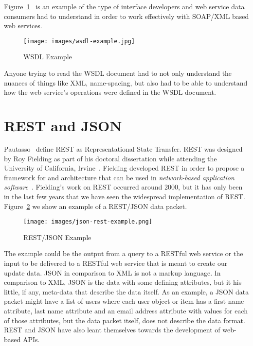 Figure~\ref{f:wsdl-example}~\cite{hid505mycodde2016} is an example of the type of
interface developers and web service data consumers had to understand in order
to work effectively with SOAP/XML based web services.  
\begin{figure}[!ht]
  \centering\texttt{[image: images/wsdl-example.jpg]}
  \caption{WSDL Example}\label{f:wsdl-example}
\end{figure}
Anyone trying to read the WSDL document had to not only understand the nuances 
of things like XML, name-spacing, but also had to be able to understand how the 
web service's operations were defined in the WSDL document.

\section{REST and JSON}
Pautasso~\cite{hid505Pautasso2008} define REST as Representational State
Transfer.  REST was designed by Roy Fielding as part of his doctoral
dissertation while attending the University of California, Irvine~\cite{hid505Fielding2000}.
Fielding developed REST in order to propose a framework for and architecture
that can be used in \emph{network-based application software}~\cite{hid505Fielding2000}.
Fielding's work on REST occurred around 2000, but it has only been in the last
few years that we have seen the widespread implementation of REST.
Figure~\ref{f:rest-example} we show an example of a REST/JSON data packet.  
\begin{figure}[!ht]
  \centering\texttt{[image: images/json-rest-example.png]}
  \caption{REST/JSON Example}\label{f:rest-example}
\end{figure}
The example could be the output from a query to a RESTful web service or the 
input to be delivered to a RESTful web service that is meant to create our update 
data.  JSON in comparison to XML is not a markup language.  In comparison to XML, 
JSON is the data with some defining attributes, but it his little, if any, 
meta-data that describe the data itself.  As an example, a JSON data packet 
might have a list of users where each user object or item has a first name 
attribute, last name attribute and an email address attribute with values for 
each of those attributes, but the data packet itself, does not describe the data 
format.  REST and JSON have also leant themselves towards the development of 
web-based APIs.

